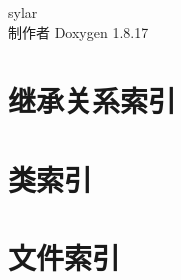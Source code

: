 \let\mypdfximage\pdfximage\def\pdfximage{\immediate\mypdfximage}\documentclass[twoside]{book}
\newcommand{\+}{\discretionary{\mbox{\scriptsize$\hookleftarrow$}}{}{}}
\newcommand{\clearemptydoublepage}{%
  \newpage{\pagestyle{empty}\cleardoublepage}%
}
\begin{document}
\begin{CJK}{UTF8}{min}

\begin{titlepage}
\vspace*{7cm}
\begin{center}%
{\Large sylar }\\
\vspace*{1cm}
{\large 制作者 Doxygen 1.8.17}\\
\end{center}
\end{titlepage}
\clearemptydoublepage
{}
\tableofcontents
\clearemptydoublepage
{}

\chapter{继承关系索引}

\chapter{类索引}

\chapter{文件索引}


\end{CJK}
\end{document}
